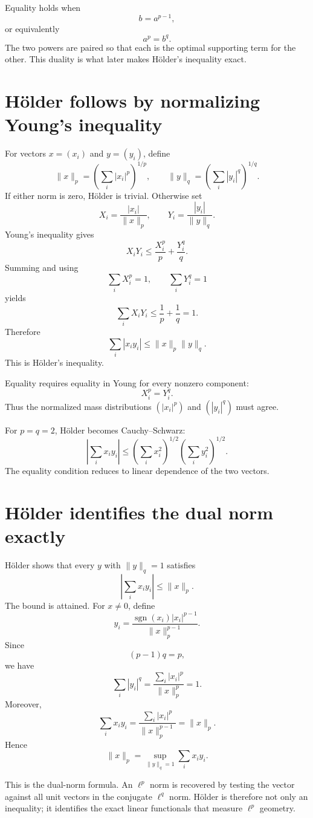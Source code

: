 Equality holds when
\[
  b=a^{p-1},
\]
or equivalently
\[
  a^p=b^q.
\]
The two powers are paired so that each is the optimal supporting term for the other.  This duality is what later makes Hölder's inequality exact.

\section{Hölder follows by normalizing Young's inequality}

For vectors \(x=(x_i)\) and \(y=(y_i)\), define
\[
  \|x\|_p=\left(\sum_i|x_i|^p\right)^{1/p},
  \qquad
  \|y\|_q=\left(\sum_i|y_i|^q\right)^{1/q}.
\]
If either norm is zero, Hölder is trivial.  Otherwise set
\[
  X_i=\frac{|x_i|}{\|x\|_p},
  \qquad
  Y_i=\frac{|y_i|}{\|y\|_q}.
\]
Young's inequality gives
\[
  X_iY_i
  \le
  \frac{X_i^p}{p}+\frac{Y_i^q}{q}.
\]
Summing and using
\[
  \sum_iX_i^p=1,
  \qquad
  \sum_iY_i^q=1
\]
yields
\[
  \sum_iX_iY_i\le\frac1p+\frac1q=1.
\]
Therefore
\[
  \boxed{
  \sum_i|x_iy_i|
  \le
  \|x\|_p\|y\|_q.}
\]
This is Hölder's inequality.

Equality requires equality in Young for every nonzero component:
\[
  X_i^p=Y_i^q.
\]
Thus the normalized mass distributions \((|x_i|^p)\) and \((|y_i|^q)\) must agree.

For \(p=q=2\), Hölder becomes Cauchy--Schwarz:
\[
  \left|\sum_i x_iy_i\right|
  \le
  \left(\sum_i x_i^2\right)^{1/2}
  \left(\sum_i y_i^2\right)^{1/2}.
\]
The equality condition reduces to linear dependence of the two vectors.

\section{Hölder identifies the dual norm exactly}

Hölder shows that every \(y\) with \(\|y\|_q=1\) satisfies
\[
  \left|\sum_i x_iy_i\right|\le\|x\|_p.
\]
The bound is attained.  For \(x\neq0\), define
\[
  y_i
  =\frac{\operatorname{sgn}(x_i)|x_i|^{p-1}}
  {\|x\|_p^{p-1}}.
\]
Since
\[
  (p-1)q=p,
\]
we have
\[
  \sum_i|y_i|^q
  =\frac{\sum_i|x_i|^p}{\|x\|_p^p}=1.
\]
Moreover,
\[
  \sum_i x_iy_i
  =\frac{\sum_i|x_i|^p}{\|x\|_p^{p-1}}
  =\|x\|_p.
\]
Hence
\[
  \boxed{
  \|x\|_p
  =\sup_{\|y\|_q=1}\sum_i x_iy_i.}
\]

This is the dual-norm formula.  An \(\ell^p\) norm is recovered by testing the vector against all unit vectors in the conjugate \(\ell^q\) norm.  Hölder is therefore not only an inequality; it identifies the exact linear functionals that measure \(\ell^p\) geometry.

